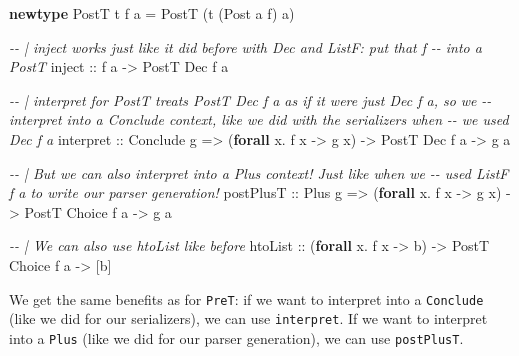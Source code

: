 \documentclass[]{article}
\newenvironment{Shaded}{}{}
\newcommand{\CommentTok}[1]{\textcolor[rgb]{0.38,0.63,0.69}{\textit{#1}}}
\newcommand{\DataTypeTok}[1]{\textcolor[rgb]{0.56,0.13,0.00}{#1}}
\newcommand{\KeywordTok}[1]{\textcolor[rgb]{0.00,0.44,0.13}{\textbf{#1}}}
\newcommand{\NormalTok}[1]{#1}
\newcommand{\OperatorTok}[1]{\textcolor[rgb]{0.40,0.40,0.40}{#1}}
\newcommand{\OtherTok}[1]{\textcolor[rgb]{0.00,0.44,0.13}{#1}}
\begin{document}
\begin{Shaded}
\begin{Highlighting}[]
\KeywordTok{newtype} \DataTypeTok{PostT}\NormalTok{ t f a }\OtherTok{=} \DataTypeTok{PostT}\NormalTok{ (t (}\DataTypeTok{Post}\NormalTok{ a f) a)}

\CommentTok{{-}{-} | \textasciigrave{}inject\textasciigrave{} works just like it did before with \textasciigrave{}Dec\textasciigrave{} and \textasciigrave{}ListF\textasciigrave{}: put that \textasciigrave{}f\textasciigrave{}}
\CommentTok{{-}{-} into a \textasciigrave{}PostT\textasciigrave{}}
\OtherTok{inject ::}\NormalTok{ f a }\OtherTok{{-}>} \DataTypeTok{PostT} \DataTypeTok{Dec}\NormalTok{ f a}

\CommentTok{{-}{-} | interpret for PostT treats \textasciigrave{}PostT Dec f a\textasciigrave{} as if it were just \textasciigrave{}Dec f a\textasciigrave{}, so we}
\CommentTok{{-}{-} interpret into a \textasciigrave{}Conclude\textasciigrave{} context, like we did with the serializers when}
\CommentTok{{-}{-} we used \textasciigrave{}Dec f a\textasciigrave{}}
\NormalTok{interpret}
\OtherTok{    ::} \DataTypeTok{Conclude}\NormalTok{ g}
    \OtherTok{=>}\NormalTok{ (}\KeywordTok{forall}\NormalTok{ x}\OperatorTok{.}\NormalTok{ f x }\OtherTok{{-}>}\NormalTok{ g x)}
    \OtherTok{{-}>} \DataTypeTok{PostT} \DataTypeTok{Dec}\NormalTok{ f a}
    \OtherTok{{-}>}\NormalTok{ g a}

\CommentTok{{-}{-} | But we can also interpret into a \textasciigrave{}Plus\textasciigrave{} context!  Just like when we}
\CommentTok{{-}{-} used \textasciigrave{}ListF f a\textasciigrave{} to write our parser generation!}
\NormalTok{postPlusT}
\OtherTok{    ::} \DataTypeTok{Plus}\NormalTok{ g}
    \OtherTok{=>}\NormalTok{ (}\KeywordTok{forall}\NormalTok{ x}\OperatorTok{.}\NormalTok{ f x }\OtherTok{{-}>}\NormalTok{ g x)}
    \OtherTok{{-}>} \DataTypeTok{PostT} \DataTypeTok{Choice}\NormalTok{ f a}
    \OtherTok{{-}>}\NormalTok{ g a}

\CommentTok{{-}{-} | We can also use htoList like before}
\NormalTok{htoList}
\OtherTok{    ::}\NormalTok{ (}\KeywordTok{forall}\NormalTok{ x}\OperatorTok{.}\NormalTok{ f x }\OtherTok{{-}>}\NormalTok{ b)}
    \OtherTok{{-}>} \DataTypeTok{PostT} \DataTypeTok{Choice}\NormalTok{ f a}
    \OtherTok{{-}>}\NormalTok{ [b]}
\end{Highlighting}
\end{Shaded}

We get the same benefits as for \texttt{PreT}: if we want to interpret into a
\texttt{Conclude} (like we did for our serializers), we can use
\texttt{interpret}. If we want to interpret into a \texttt{Plus} (like we did
for our parser generation), we can use \texttt{postPlusT}.
\end{document}
